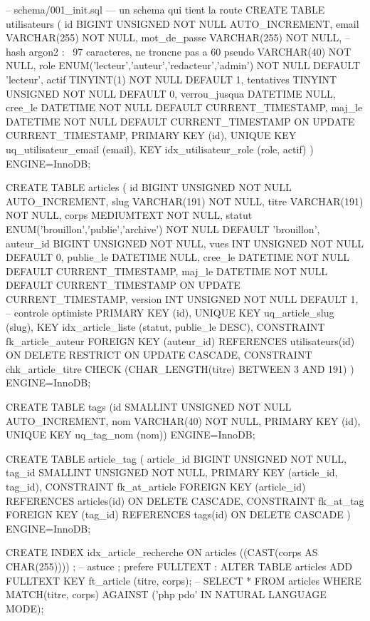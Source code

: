 \documentclass[12pt,a4paper,twoside,openright]{book}
\begin{document}
\begin{codesql}
-- schema/001_init.sql --- un schema qui tient la route
CREATE TABLE utilisateurs (
  id            BIGINT UNSIGNED NOT NULL AUTO_INCREMENT,
  email         VARCHAR(255)    NOT NULL,
  mot_de_passe  VARCHAR(255)    NOT NULL,          -- hash argon2 : ~97 caracteres, ne troncne pas a 60
  pseudo        VARCHAR(40)     NOT NULL,
  role          ENUM('lecteur','auteur','redacteur','admin') NOT NULL DEFAULT 'lecteur',
  actif         TINYINT(1)      NOT NULL DEFAULT 1,
  tentatives    TINYINT UNSIGNED NOT NULL DEFAULT 0,
  verrou_jusqua DATETIME        NULL,
  cree_le       DATETIME        NOT NULL DEFAULT CURRENT_TIMESTAMP,
  maj_le        DATETIME        NOT NULL DEFAULT CURRENT_TIMESTAMP ON UPDATE CURRENT_TIMESTAMP,
  PRIMARY KEY (id),
  UNIQUE KEY uq_utilisateur_email (email),
  KEY idx_utilisateur_role (role, actif)
) ENGINE=InnoDB;

CREATE TABLE articles (
  id          BIGINT UNSIGNED NOT NULL AUTO_INCREMENT,
  slug        VARCHAR(191)    NOT NULL,
  titre       VARCHAR(191)    NOT NULL,
  corps       MEDIUMTEXT      NOT NULL,
  statut      ENUM('brouillon','publie','archive') NOT NULL DEFAULT 'brouillon',
  auteur_id   BIGINT UNSIGNED NOT NULL,
  vues        INT UNSIGNED    NOT NULL DEFAULT 0,
  publie_le   DATETIME        NULL,
  cree_le     DATETIME        NOT NULL DEFAULT CURRENT_TIMESTAMP,
  maj_le      DATETIME        NOT NULL DEFAULT CURRENT_TIMESTAMP ON UPDATE CURRENT_TIMESTAMP,
  version     INT UNSIGNED    NOT NULL DEFAULT 1,      -- controle optimiste
  PRIMARY KEY (id),
  UNIQUE KEY uq_article_slug (slug),
  KEY idx_article_liste (statut, publie_le DESC),
  CONSTRAINT fk_article_auteur FOREIGN KEY (auteur_id) REFERENCES utilisateurs(id)
    ON DELETE RESTRICT ON UPDATE CASCADE,
  CONSTRAINT chk_article_titre CHECK (CHAR_LENGTH(titre) BETWEEN 3 AND 191)
) ENGINE=InnoDB;

CREATE TABLE tags (id SMALLINT UNSIGNED NOT NULL AUTO_INCREMENT, nom VARCHAR(40) NOT NULL,
  PRIMARY KEY (id), UNIQUE KEY uq_tag_nom (nom)) ENGINE=InnoDB;

CREATE TABLE article_tag (
  article_id BIGINT UNSIGNED NOT NULL,
  tag_id     SMALLINT UNSIGNED NOT NULL,
  PRIMARY KEY (article_id, tag_id),
  CONSTRAINT fk_at_article FOREIGN KEY (article_id) REFERENCES articles(id) ON DELETE CASCADE,
  CONSTRAINT fk_at_tag     FOREIGN KEY (tag_id)     REFERENCES tags(id)     ON DELETE CASCADE
) ENGINE=InnoDB;

CREATE INDEX idx_article_recherche ON articles ((CAST(corps AS CHAR(255)))) ;  -- astuce ; prefere FULLTEXT :
ALTER TABLE articles ADD FULLTEXT KEY ft_article (titre, corps);
-- SELECT * FROM articles WHERE MATCH(titre, corps) AGAINST ('php pdo' IN NATURAL LANGUAGE MODE);
\end{codesql}
\end{document}
